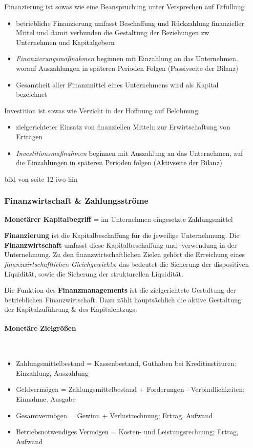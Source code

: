 \documentclass[11pt]{article}
\begin{document}
Finanzierung ist sowas wie eine Beanspruchung unter Versprechen auf Erfüllung
\begin{itemize}
\item betriebliche Finanzierung umfasst Beschaffung und Rückzahlung finanzieller Mittel und damit verbunden die Gestaltung der Beziehungen zw Unternehmen und Kapitalgebern
\item \emph{Finanzierungsmaßnahmen} beginnen mit Einzahlung an das Unternehmen, worauf Auszahlungen in späteren Perioden Folgen (Passivseite der Bilanz)
\item Gesamtheit aller Finanzmittel eines Unternehmens wird als Kapital bezeichnet
\end{itemize}

Investition ist sowas wie Verzicht in der Hoffnung auf Belohnung
\begin{itemize}
\item zielgerichteter Einsatz von finanziellen Mitteln zur Erwirtschaftung von Erträgen
\item \emph{Investitionsmaßnahmen} beginnen mit Auszahlung an das Unternehmen, auf die Einzahlungen in späteren Perioden folgen (Aktivseite der Bilanz)
\end{itemize}
bild von seite 12 iwo hin

\subsubsection{Finanzwirtschaft \& Zahlungsströme}
\label{sec:org6fb75c3}
\textbf{Monetärer Kapitalbegriff} = im Unternehmen eingesetzte Zahlungsmittel

\textbf{Finanzierung} ist die Kapitalbeschaffung für die jeweilige Unternehmung. Die \textbf{Finanzwirtschaft} umfasst diese Kapitalbeschaffung und -verwendung in der Unternehmung. Zu den finanzwirtschaftlichen Zielen gehört die Erreichung eines \emph{finanzwirtschaftlichen Gleichgewichts}, das bedeutet die Sicherung der dispositiven Liquidität, sowie die Sicherung der strukturellen Liquidität.

Die Funktion des \textbf{Finanzmanagements} ist die zielgerichtete Gestaltung der betrieblichen Finanzwirtschaft. Dazu zählt hauptsächlich die aktive Gestaltung der Kapitalzuführung \& des Kapitalentzugs.

\paragraph{Monetäre Zielgrößen}\\
\begin{itemize}
\item Zahlungsmittelbestand = Kassenbestand, Guthaben bei Kreditinstituren; Einzahlung, Auszahlung
\item Geldvermögen = Zahlungsmittelbestand + Forderungen - Verbindlichkeiten; Einnahme, Ausgabe
\item Gesamtvermögen = Gewinn + Verlustrechnung; Ertrag, Aufwand
\item Betriebsnotwendiges Vermögen = Kosten- und Leistungsrechnung; Ertrag, Aufwand
\end{itemize}
\end{document}
